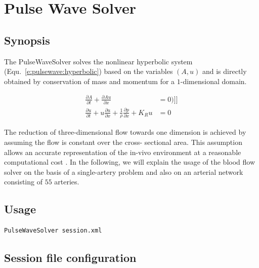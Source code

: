 \chapter{Pulse Wave Solver}

\section{Synopsis}

The PulseWaveSolver solves the nonlinear hyperbolic system
(Equ.~\ref{e:pulsewave:hyperbolic}) based on the variables $(A,u)$ and is
directly obtained by conservation of mass and momentum for a $1$-dimensional
domain.

\begin{subequations}
\begin{align}
\frac{\partial A}{\partial t} + \frac{\partial A u}{\partial x} &= 0 )]] \\
\frac{\partial u}{\partial t} + u \frac{\partial u}{\partial x} + \frac{1}{\rho}
\frac{\partial p}{\partial x} + K_R u&= 0 
\label{e:pulsewave:hyperbolic}
\end{align}
\end{subequations}

The reduction of three-dimensional flow towards one dimension is achieved by
assuming the flow is constant over the cross- sectional area. This assumption
allows an accurate representation of the in-vivo environment at a reasonable
computational cost \cite{ShFoPeFr03}. In the following, we will explain
the usage of the blood flow solver on the basis of a single-artery problem and
also on an arterial network consisting of $55$ arteries.

\section{Usage}
\begin{lstlisting}[style=BashInputStyle]
PulseWaveSolver session.xml
\end{lstlisting}

\section{Session file configuration}

